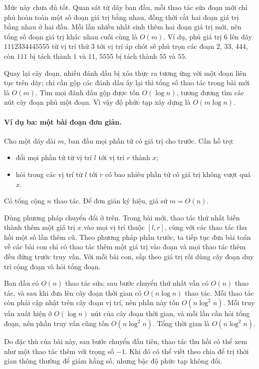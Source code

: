 \documentclass[11pt]{article}
\begin{document}
Mức này chưa đủ tốt. Quan sát từ dãy ban đầu, mỗi thao tác sửa đoạn mới chỉ
phủ hoàn toàn một số đoạn giá trị bằng nhau, đồng thời cắt hai đoạn giá trị
bằng nhau ở hai đầu. Mỗi lần nhiều nhất sinh thêm hai đoạn giá trị mới, nên
tổng số đoạn giá trị khác nhau cuối cùng là \(O(m)\). Ví dụ, phủ giá trị
\(6\) lên dãy \(1112334445555\) từ vị trí thứ \(3\) tới vị trí áp chót sẽ phủ
trọn các đoạn \(2\), \(33\), \(444\), còn \(111\) bị tách thành \(1\) và
\(11\), \(5555\) bị tách thành \(55\) và \(55\).

Quay lại cây đoạn, nhiều đánh dấu bị xóa thực ra tương ứng với một đoạn liên
tục trên dãy; chỉ cần gộp các đánh dấu ấy lại thì tổng số thao tác trong bài
mới là \(O(m)\). Tìm mọi đánh dấu gộp được tốn \(O(\log n)\), tương đương tìm
các nút cây đoạn phủ một đoạn. Vì vậy độ phức tạp xây dựng là
\(O(m\log n)\).

\paragraph{Ví dụ ba: một bài đoạn đơn giản.}
Cho một dãy dài \(m\), ban đầu mọi phần tử có giá trị cho trước. Cần hỗ trợ:
\begin{itemize}
  \item đổi mọi phần tử từ vị trí \(l\) tới vị trí \(r\) thành \(x\);
  \item hỏi trong các vị trí từ \(l\) tới \(r\) có bao nhiêu phần tử có giá trị
  không vượt quá \(x\).
\end{itemize}
Có tổng cộng \(n\) thao tác. Để đơn giản ký hiệu, giả sử \(m=O(n)\).

Dùng phương pháp chuyển đổi ở trên. Trong bài mới, thao tác thứ nhất biến
thành thêm một giá trị \(x\) vào mọi vị trí thuộc \([l,r]\), cùng với các thao
tác thu hồi một số lần thêm cũ. Theo phương pháp phần trước, ta tiếp tục đưa
bài toán về các bài con chỉ có thao tác thêm một giá trị vào đoạn và mọi thao
tác thêm đều đứng trước truy vấn. Với mỗi bài con, sắp theo giá trị rồi dùng
cây đoạn duy trì cộng đoạn và hỏi tổng đoạn.

Ban đầu có \(O(n)\) thao tác sửa; sau bước chuyển thứ nhất vẫn có \(O(n)\)
thao tác, và sau khi đưa lên cây đoạn thời gian có \(O(n\log n)\) thao tác.
Mỗi thao tác còn phải cập nhật trên cây đoạn vị trí, nên phần này tốn
\(O(n\log^2 n)\). Mỗi truy vấn xuất hiện ở \(O(\log n)\) nút của cây đoạn thời
gian, và mỗi lần cần hỏi tổng đoạn, nên phần truy vấn cũng tốn
\(O(n\log^2 n)\). Tổng thời gian là \(O(n\log^2 n)\).

Do đặc thù của bài này, sau bước chuyển đầu tiên, thao tác thu hồi có thể xem
như một thao tác thêm với trọng số \(-1\). Khi đó có thể viết theo chia để trị
thời gian thông thường để giảm hằng số, nhưng bậc độ phức tạp không đổi.
\end{document}
